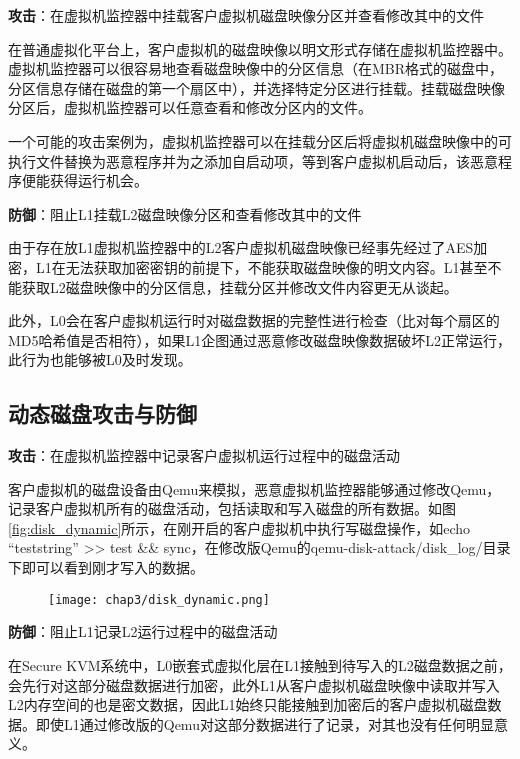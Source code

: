 \noindent
\textbf{攻击\uppercase\expandafter{}}：在虚拟机监控器中挂载客户虚拟机磁盘映像分区并查看修改其中的文件

在普通虚拟化平台上，客户虚拟机的磁盘映像以明文形式存储在虚拟机监控器中。虚拟机监控器可以很容易地查看磁盘映像中的分区信息（在MBR格式的磁盘中，分区信息存储在磁盘的第一个扇区中），并选择特定分区进行挂载。挂载磁盘映像分区后，虚拟机监控器可以任意查看和修改分区内的文件。

一个可能的攻击案例为，虚拟机监控器可以在挂载分区后将虚拟机磁盘映像中的可执行文件替换为恶意程序并为之添加自启动项，等到客户虚拟机启动后，该恶意程序便能获得运行机会。

\noindent
\textbf{防御\uppercase\expandafter{}}：阻止L1挂载L2磁盘映像分区和查看修改其中的文件

由于存在放L1虚拟机监控器中的L2客户虚拟机磁盘映像已经事先经过了AES加密，L1在无法获取加密密钥的前提下，不能获取磁盘映像的明文内容。L1甚至不能获取L2磁盘映像中的分区信息，挂载分区并修改文件内容更无从谈起。

此外，L0会在客户虚拟机运行时对磁盘数据的完整性进行检查（比对每个扇区的MD5哈希值是否相符），如果L1企图通过恶意修改磁盘映像数据破坏L2正常运行，此行为也能够被L0及时发现。

\subsection{动态磁盘攻击与防御}

\noindent
\textbf{攻击\uppercase\expandafter{}}：在虚拟机监控器中记录客户虚拟机运行过程中的磁盘活动

客户虚拟机的磁盘设备由Qemu来模拟，恶意虚拟机监控器能够通过修改Qemu，记录客户虚拟机所有的磁盘活动，包括读取和写入磁盘的所有数据。如图\ref{fig:disk_dynamic}所示，在刚开启的客户虚拟机中执行写磁盘操作，如echo ``teststring'' >> test \&\& sync，在修改版Qemu的qemu-disk-attack/disk\_log/目录下即可以看到刚才写入的数据。

\begin{figure}[!htbp]
  \centering
  \texttt{[image: chap3/disk\_dynamic.png]}
\end{figure}

\noindent
\textbf{防御\uppercase\expandafter{}}：阻止L1记录L2运行过程中的磁盘活动

在Secure KVM系统中，L0嵌套式虚拟化层在L1接触到待写入的L2磁盘数据之前，会先行对这部分磁盘数据进行加密，此外L1从客户虚拟机磁盘映像中读取并写入L2内存空间的也是密文数据，因此L1始终只能接触到加密后的客户虚拟机磁盘数据。即使L1通过修改版的Qemu对这部分数据进行了记录，对其也没有任何明显意义。

